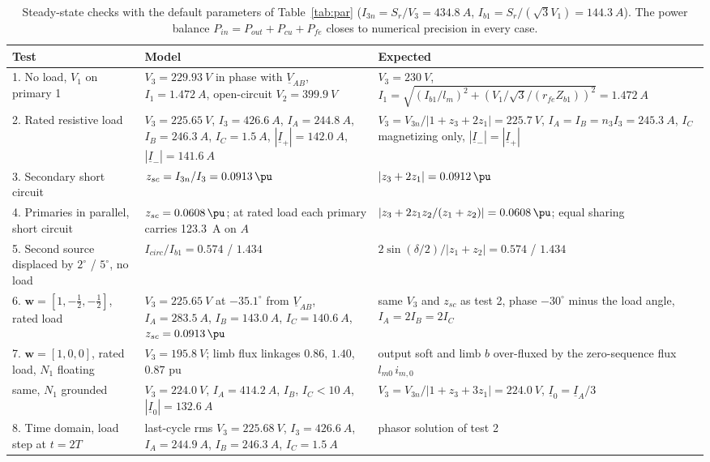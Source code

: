 \documentclass[10pt,a4paper]{scrartcl}
\newcommand{\ph}[1]{\underline{#1}}
\newcommand{\vect}[1]{\boldsymbol{#1}}
\begin{document}
\begin{onehalfspace}
\begin{table}[htbp]
\centering
\caption{Steady-state checks with the default parameters of Table~\ref{tab:par} ($I_{3n} = S_r/V_3 = \SI{434.8}{A}$, $I_{b1} = S_r/(\sqrt3 V_1) = \SI{144.3}{A}$). The power balance $P_{in} = P_{out} + P_{cu} + P_{fe}$ closes to numerical precision in every case.}
\label{tab:verif}
\small
\begin{tabular}{p{5.3cm}p{5.1cm}p{5.1cm}}
\toprule
Test & Model & Expected \\
\midrule
1. No load, $V_1$ on primary 1 & $V_3 = \SI{229.93}{V}$ in phase with $\ph{V}_{AB}$, $I_1 = \SI{1.472}{A}$, open-circuit $V_2 = \SI{399.9}{V}$ & $V_3 = \SI{230}{V}$, $I_1 = \sqrt{(I_{b1}/l_m)^2 + (V_1/\sqrt3/(r_{fe}Z_{b1}))^2} = \SI{1.472}{A}$ \\
2. Rated resistive load & $V_3 = \SI{225.65}{V}$, $I_3 = \SI{426.6}{A}$, $I_A = \SI{244.8}{A}$, $I_B = \SI{246.3}{A}$, $I_C = \SI{1.5}{A}$, $|\ph{I}_+| = \SI{142.0}{A}$, $|\ph{I}_-| = \SI{141.6}{A}$ & $V_3 = V_{3n}/|1 + z_3 + 2z_1| = \SI{225.7}{V}$, $I_A = I_B = n_3 I_3 = \SI{245.3}{A}$, $I_C$ magnetizing only, $|\ph{I}_-| = |\ph{I}_+|$ \\
3. Secondary short circuit & $z_{sc} = I_{3n}/I_3 = \SI{0.0913}{\pu}$ & $|z_3 + 2z_1| = \SI{0.0912}{\pu}$ \\
4. Primaries in parallel, short circuit & $z_{sc} = \SI{0.0608}{\pu}$; at rated load each primary carries \SI{123.3}{A} on $A$ & $|z_3 + 2 z_1 z_2/(z_1+z_2)| = \SI{0.0608}{\pu}$; equal sharing \\
5. Second source displaced by $2^\circ$ / $5^\circ$, no load & $I_{circ}/I_{b1} = 0.574$ / $1.434$ & $2\sin(\delta/2)/|z_1+z_2| = 0.574$ / $1.434$ \\
6. $\vect{w} = [1,-\tfrac12,-\tfrac12]$, rated load & $V_3 = \SI{225.65}{V}$ at $-35.1^\circ$ from $\ph{V}_{AB}$, $I_A = \SI{283.5}{A}$, $I_B = \SI{143.0}{A}$, $I_C = \SI{140.6}{A}$, $z_{sc} = \SI{0.0913}{\pu}$ & same $V_3$ and $z_{sc}$ as test 2, phase $-30^\circ$ minus the load angle, $I_A = 2I_B = 2I_C$ \\
7. $\vect{w} = [1,0,0]$, rated load, $N_1$ floating & $V_3 = \SI{195.8}{V}$; limb flux linkages $0.86$, $1.40$, $0.87$ pu & output soft and limb $b$ over-fluxed by the zero-sequence flux $l_{m0}\,i_{m,0}$ \\
\phantom{7.} same, $N_1$ grounded & $V_3 = \SI{224.0}{V}$, $I_A = \SI{414.2}{A}$, $I_B$, $I_C < \SI{10}{A}$, $|\ph{I}_0| = \SI{132.6}{A}$ & $V_3 = V_{3n}/|1 + z_3 + 3z_1| = \SI{224.0}{V}$, $\ph{I}_0 = \ph{I}_A/3$ \\
8. Time domain, load step at $t = 2T$ & last-cycle rms $V_3 = \SI{225.68}{V}$, $I_3 = \SI{426.6}{A}$, $I_A = \SI{244.9}{A}$, $I_B = \SI{246.3}{A}$, $I_C = \SI{1.5}{A}$ & phasor solution of test 2 \\
\bottomrule
\end{tabular}
\end{table}


\end{onehalfspace}
\end{document}
